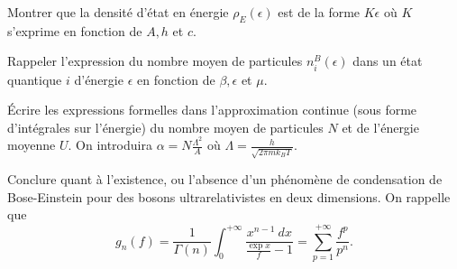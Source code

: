 \documentclass[utf8, 11pt]{feuille}
\begin{document}
\question Montrer que la densité d'état en énergie $\rho_E(\epsilon)$ est de la forme $K \epsilon$ où $K$ s'exprime en fonction de $A, h$ et $c$. 

\question Rappeler l'expression du nombre moyen de particules $n_i^B(\epsilon)$ dans un état quantique $i$ d'énergie $\epsilon$ en fonction de $\beta, \epsilon$ et $\mu$.

\question \'Ecrire les expressions formelles dans l'approximation continue (sous forme d'intégrales sur l'énergie)  du nombre moyen de particules $N$ et de l'énergie moyenne $U$. On introduira $\alpha=N\frac{\Lambda^2}{A}$ où $\Lambda=\frac{h}{\sqrt{2\pi m k_B T}}$.

\question
Conclure quant à l'existence, ou l'absence d'un phénomène de condensation de Bose-Einstein pour des bosons ultrarelativistes en deux dimensions. On rappelle que
\begin{equation}
g_n(f)=\frac{1}{\Gamma (n)} \int_0^{+\infty} \frac{x^{n-1}\ dx}{\frac{\exp x}{f}-1}=\sum\limits_{p=1}^{+\infty} \frac{f^p}{p^n}.
\end{equation}
\end{document}
